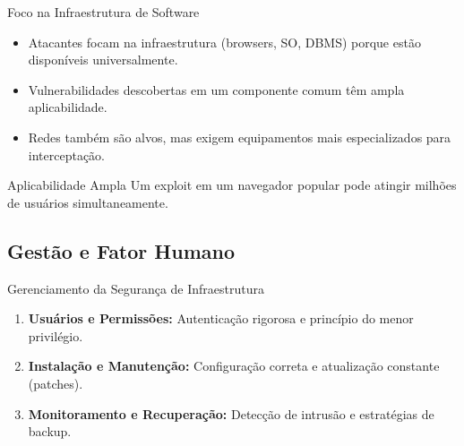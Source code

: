 \documentclass[aspectratio=169]{beamer}
\begin{document}
\begin{frame}{Foco na Infraestrutura de Software}
    \begin{itemize}
        \item Atacantes focam na infraestrutura (browsers, SO, DBMS) porque estão disponíveis universalmente.
        \item Vulnerabilidades descobertas em um componente comum têm ampla aplicabilidade.
        \item Redes também são alvos, mas exigem equipamentos mais especializados para interceptação.
    \end{itemize}
    \begin{alertblock}{Aplicabilidade Ampla}
        Um exploit em um navegador popular pode atingir milhões de usuários simultaneamente.
    \end{alertblock}
\end{frame}

\subsection{Gestão e Fator Humano}
\begin{frame}{Gerenciamento da Segurança de Infraestrutura}
    \begin{enumerate}
        \item \textbf{Usuários e Permissões:} Autenticação rigorosa e princípio do menor privilégio.
        \item \textbf{Instalação e Manutenção:} Configuração correta e atualização constante (patches).
        \item \textbf{Monitoramento e Recuperação:} Detecção de intrusão e estratégias de backup.
    \end{enumerate}
    \vspace{0.3cm}
    \centering
\end{frame}
\end{document}
